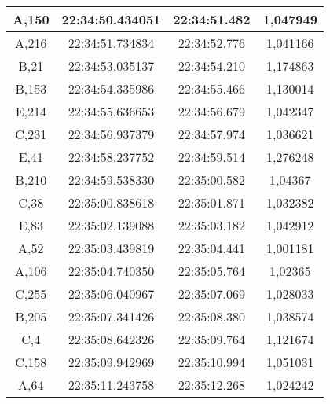 \begin{table}[!h]
\begin{tabular}{|ccc|c|}
  \multicolumn{1}{|c|}{A,150} & \multicolumn{1}{c|}{22:34:50.434051} & 22:34:51.482       & 1,047949    \\ \hline
  \multicolumn{1}{|c|}{A,216} & \multicolumn{1}{c|}{22:34:51.734834} & 22:34:52.776       & 1,041166    \\ \hline
  \multicolumn{1}{|c|}{B,21}  & \multicolumn{1}{c|}{22:34:53.035137} & 22:34:54.210       & 1,174863    \\ \hline
  \multicolumn{1}{|c|}{B,153} & \multicolumn{1}{c|}{22:34:54.335986} & 22:34:55.466       & 1,130014    \\ \hline
  \multicolumn{1}{|c|}{E,214} & \multicolumn{1}{c|}{22:34:55.636653} & 22:34:56.679       & 1,042347    \\ \hline
  \multicolumn{1}{|c|}{C,231} & \multicolumn{1}{c|}{22:34:56.937379} & 22:34:57.974       & 1,036621    \\ \hline
  \multicolumn{1}{|c|}{E,41}  & \multicolumn{1}{c|}{22:34:58.237752} & 22:34:59.514       & 1,276248    \\ \hline
  \multicolumn{1}{|c|}{B,210} & \multicolumn{1}{c|}{22:34:59.538330} & 22:35:00.582       & 1,04367     \\ \hline
  \multicolumn{1}{|c|}{C,38}  & \multicolumn{1}{c|}{22:35:00.838618} & 22:35:01.871       & 1,032382    \\ \hline
  \multicolumn{1}{|c|}{E,83}  & \multicolumn{1}{c|}{22:35:02.139088} & 22:35:03.182       & 1,042912    \\ \hline
  \multicolumn{1}{|c|}{A,52}  & \multicolumn{1}{c|}{22:35:03.439819} & 22:35:04.441       & 1,001181    \\ \hline
  \multicolumn{1}{|c|}{A,106} & \multicolumn{1}{c|}{22:35:04.740350} & 22:35:05.764       & 1,02365     \\ \hline
  \multicolumn{1}{|c|}{C,255} & \multicolumn{1}{c|}{22:35:06.040967} & 22:35:07.069       & 1,028033    \\ \hline
  \multicolumn{1}{|c|}{B,205} & \multicolumn{1}{c|}{22:35:07.341426} & 22:35:08.380       & 1,038574    \\ \hline
  \multicolumn{1}{|c|}{C,4}   & \multicolumn{1}{c|}{22:35:08.642326} & 22:35:09.764       & 1,121674    \\ \hline
  \multicolumn{1}{|c|}{C,158} & \multicolumn{1}{c|}{22:35:09.942969} & 22:35:10.994       & 1,051031    \\ \hline
  \multicolumn{1}{|c|}{A,64}  & \multicolumn{1}{c|}{22:35:11.243758} & 22:35:12.268       & 1,024242    \\ \hline

\end{tabular}
\end{table}
